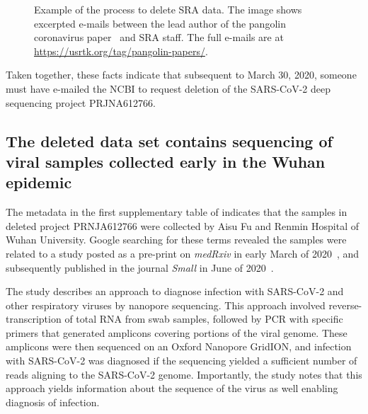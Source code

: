 \documentclass[9pt,twocolumn,twoside]{gsajnl_modified}
\begin{document}
\begin{figure}[]
\centering
{}
\caption{Example of the process to delete SRA data.
The image shows excerpted e-mails between the lead author of the pangolin coronavirus paper~\citep{xiao2020isolation} and SRA staff.
The full e-mails are at \url{https://usrtk.org/tag/pangolin-papers/}.
}
\label{fig:pangolin_emails}
\end{figure}

Taken together, these facts indicate that subsequent to March 30, 2020, someone must have e-mailed the NCBI to request deletion of the SARS-CoV-2 deep sequencing project PRJNA612766.

\subsection{The deleted data set contains sequencing of viral samples collected early in the Wuhan epidemic}
The metadata in the first supplementary table of \citet{farkas2020insights} indicates that the samples in deleted project PRNJA612766 were collected by Aisu Fu and Renmin Hospital of Wuhan University.
Google searching for these terms revealed the samples were related to a study posted as a pre-print on \textit{medRxiv} in early March of 2020~\citep{wang2020medRxiv}, and subsequently published in the journal \textit{Small} in June of 2020~\citep{wang2020small}.

The study describes an approach to diagnose infection with SARS-CoV-2 and other respiratory viruses by nanopore sequencing.
This approach involved reverse-transcription of total RNA from swab samples, followed by PCR with specific primers that generated amplicons covering portions of the viral genome.
These amplicons were then sequenced on an Oxford Nanopore GridION, and infection with SARS-CoV-2 was diagnosed if the sequencing yielded a sufficient number of reads aligning to the SARS-CoV-2 genome.
Importantly, the study notes that this approach yields information about the sequence of the virus as well enabling diagnosis of infection.
\end{document}

